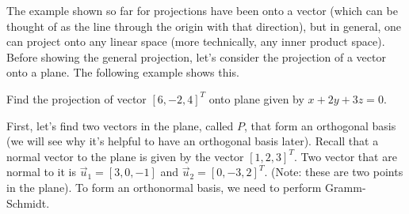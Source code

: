The example shown so far for projections have been onto a vector (which can be thought of as the line through the origin with that direction), but in general, one can project onto any linear space (more technically, any inner product space).  Before showing the general projection, let's consider the projection of a vector onto a plane.  The following example shows this.  




\begin{example}
Find the projection of vector $[6,-2,4]^T$ onto plane given by $x+2y+3z=0$.  
 
 \solution
 
 First, let's find two vectors in the plane, called $P$, that form an orthogonal basis (we will see why it's helpful to have an orthogonal basis later).  Recall that a normal vector to the plane is given by the vector $[1,2,3]^T$.  Two vector that are normal to it is $\vec{u}_1=[3,0,-1]$ and $\vec{u}_2=[0,-3,2]^T$.  (Note: these are two points in the plane).  To form an orthonormal basis, we need to perform Gramm-Schmidt.  
 

\end{example}
